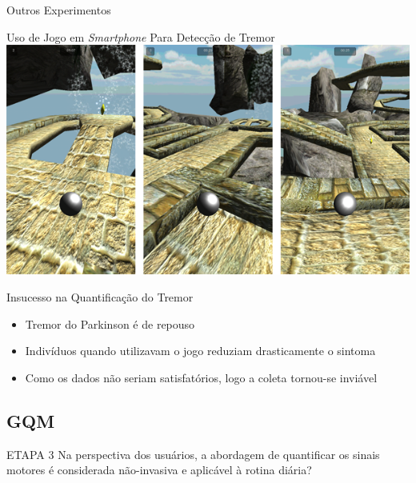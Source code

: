 \documentclass{beamer}
\begin{document}
\begin{frame}{Outros Experimentos}
	\begin{block}{Uso de Jogo em \textit{Smartphone} Para Detecção de Tremor}
	\center \includegraphics[height=1 in]{img/pinball_world.png}
	\end{block}
	\begin{block}{Insucesso na Quantificação do Tremor}
			\begin{itemize}
			\item Tremor do Parkinson é de repouso
			\item Indivíduos quando utilizavam o jogo reduziam drasticamente o sintoma
			\item Como os dados não seriam satisfatórios, logo a coleta tornou-se inviável
		\end{itemize}
	\end{block}
\end{frame}



\subsection{GQM}

\begin{frame}
  \begin{block}{ETAPA 3}
   Na perspectiva dos usuários, a abordagem de quantificar os sinais motores é considerada não-invasiva e aplicável à rotina diária?
  \end{block}
\end{frame}

\end{document}
